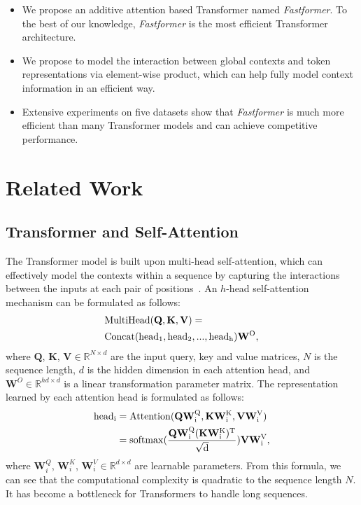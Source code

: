 \documentclass[11pt,a4paper]{article}
\begin{document}
\begin{itemize}
    \item We propose an additive attention based  Transformer named \textit{Fastformer}.
    To the best of our knowledge, \textit{Fastformer} is the most efficient Transformer architecture.
    \item We propose to model the interaction between global contexts and  token representations via element-wise product, which can help fully model context information in an efficient way. 
    \item Extensive experiments on five datasets show that \textit{Fastformer} is much more efficient than many Transformer models and can achieve competitive performance.
\end{itemize} \section{Related Work}

\subsection{Transformer and Self-Attention}

The Transformer model is built upon multi-head self-attention, which can effectively model the contexts within a sequence by capturing the interactions between the inputs at each pair of positions~\cite{vaswani2017attention}.
An $h$-head self-attention mechanism can be formulated as follows:
\begin{equation}
\begin{aligned}
    &\rm{MultiHead}(\mathbf{Q}, \mathbf{K}, \mathbf{V}) =\\ 
    &\rm{Concat}(\rm{head}_1, \rm{head}_2, ..., \rm{head}_h)\mathbf{W}^O,
\end{aligned}
\end{equation}
where $\mathbf{Q}$, $\mathbf{K}$, $\mathbf{V}\in \mathbb{R}^{N\times d}$ are the input query, key and value matrices, $N$ is the sequence length, $d$ is the hidden dimension in each attention head, and $\mathbf{W}^O\in \mathbb{R}^{hd\times d}$ is a linear transformation parameter matrix.
The representation learned by each attention head is formulated as follows:
\begin{equation}
\begin{aligned}
    \rm{head}_i&= \rm{Attention}(\mathbf{Q}\mathbf{W}^Q_i,\mathbf{K}\mathbf{W}^K_i,\mathbf{V}\mathbf{W}^V_i)\\ 
    &=\rm{softmax}(\frac{\mathbf{Q}\mathbf{W}^Q_i(\mathbf{K}\mathbf{W}^K_i)^T}{\sqrt{d}})\mathbf{V}\mathbf{W}^V_i,
\end{aligned}
\end{equation}
where $\mathbf{W}^Q_i$, $\mathbf{W}^K_i$, $\mathbf{W}^V_i\in \mathbb{R}^{d\times d}$ are learnable parameters.
From this formula, we can see that the computational complexity is quadratic to the sequence length $N$.
It has become a bottleneck for Transformers to handle long sequences.
\end{document}
